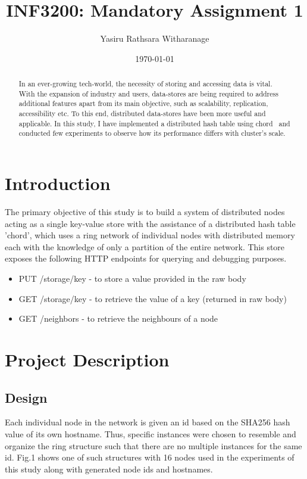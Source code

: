 \documentclass[
    a4paper,
    twocolumn,
]{article}
\title{INF3200: Mandatory Assignment 1}
\author{Yasiru Rathsara Witharanage}
\date{\today}
\begin{document}
\maketitle

\begin{abstract}
    In an ever-growing tech-world, the necessity of storing and accessing data is vital. With the expansion of industry and users, data-stores are being required to address additional features apart from its main objective, such as scalability, replication, accessibility etc. To this end, distributed data-stores have been more useful and applicable. In this study, I have implemented a distributed hash table using chord~\cite{1} and conducted few experiments to observe how its performance differs with cluster's scale.
\end{abstract}

\section{Introduction}

The primary objective of this study is to build a system of distributed nodes acting as a single key-value store with the assistance of a distributed hash table 'chord', which uses a ring network of individual nodes with distributed memory each with the knowledge of only a partition of the entire network. This store exposes the following HTTP endpoints for querying and debugging purposes.

\begin{itemize}
	\item PUT /storage/key - to store a value provided in the raw body
	\item GET /storage/key - to retrieve the value of a key (returned in raw body)
	\item GET /neighbors - to retrieve the neighbours of a node
\end{itemize}

\section{Project Description}
\subsection{Design}

Each individual node in the network is given an id based on the SHA256 hash value of its own hostname. Thus, specific instances were chosen to resemble and organize the ring structure such that there are no multiple instances for the same id. Fig.1 shows one of such structures with 16 nodes used in the experiments of this study along with generated node ids and hostnames.
\end{document}
